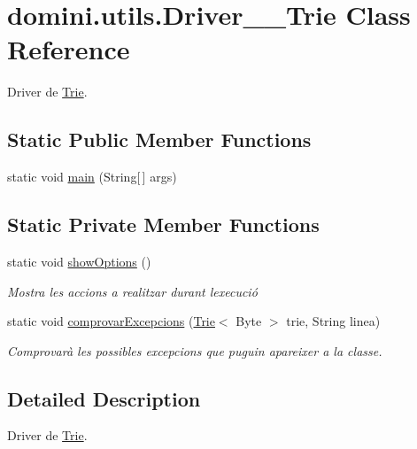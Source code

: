 \hypertarget{classdomini_1_1utils_1_1Driver____Trie}{}\section{domini.\+utils.\+Driver\+\_\+\+\_\+\+Trie Class Reference}
\label{classdomini_1_1utils_1_1Driver____Trie}


Driver de \hyperlink{classdomini_1_1utils_1_1Trie}{Trie}.  


\subsection*{Static Public Member Functions}
\begin{DoxyCompactItemize}
\item 
static void \hyperlink{classdomini_1_1utils_1_1Driver____Trie_a00769a23a8d74a6f4bc05c19a2bd8519}{main} (String\mbox{[}$\,$\mbox{]} args)
\end{DoxyCompactItemize}
\subsection*{Static Private Member Functions}
\begin{DoxyCompactItemize}
\item 
static void \hyperlink{classdomini_1_1utils_1_1Driver____Trie_a8b61698744500c2c6ffa92f861162ff5}{show\+Options} ()
\begin{DoxyCompactList}\small\item\em Mostra les accions a realitzar durant l\textquotesingle{}execució \end{DoxyCompactList}\item 
static void \hyperlink{classdomini_1_1utils_1_1Driver____Trie_a6fd273250b3951144ce3a76f26330ab1}{comprovar\+Excepcions} (\hyperlink{classdomini_1_1utils_1_1Trie}{Trie}$<$ Byte $>$ trie, String linea)
\begin{DoxyCompactList}\small\item\em Comprovarà les possibles excepcions que puguin apareixer a la classe. \end{DoxyCompactList}\end{DoxyCompactItemize}


\subsection{Detailed Description}
Driver de \hyperlink{classdomini_1_1utils_1_1Trie}{Trie}. 

